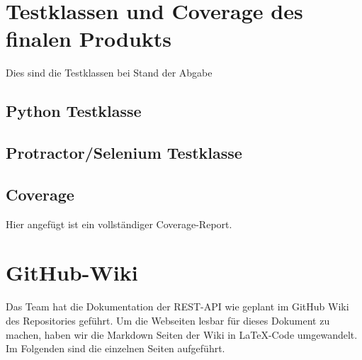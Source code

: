 \documentclass[accentcolor=tud0b,12pt,paper=a4]{tudreport}
\begin{document}
	

\chapter{Testklassen und Coverage des finalen Produkts}

	Dies sind die Testklassen bei Stand der Abgabe

	\section{Python Testklasse}
	

	\section{Protractor/Selenium Testklasse}
	

	\section{Coverage}
	Hier angefügt ist ein vollständiger Coverage-Report.
	
	
	
	
	
	
	
	
	

\chapter{GitHub-Wiki}
	Das Team hat die Dokumentation der REST-API wie geplant im GitHub Wiki des Repositories geführt. Um die Webseiten lesbar für dieses Dokument zu machen, haben wir die Markdown Seiten der Wiki in \LaTeX-Code umgewandelt. Im Folgenden sind die einzelnen Seiten aufgeführt.
\end{document}
